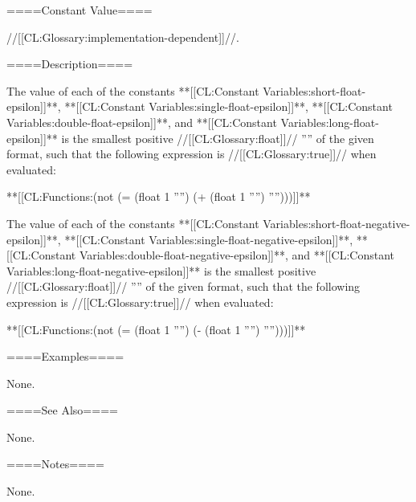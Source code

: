 
====Constant Value====

//[[CL:Glossary:implementation-dependent]]//.

====Description====

The value of each of the constants **[[CL:Constant Variables:short-float-epsilon]]**, **[[CL:Constant Variables:single-float-epsilon]]**, **[[CL:Constant Variables:double-float-epsilon]]**, and **[[CL:Constant Variables:long-float-epsilon]]** is the smallest positive //[[CL:Glossary:float]]// ''\epsilon'' of the given format, such that the following expression is //[[CL:Glossary:true]]// when evaluated:

**[[CL:Functions:(not (= (float 1 ''\epsilon'') (+ (float 1 ''\epsilon'') ''\epsilon'')))\/]]**

The value of each of the constants **[[CL:Constant Variables:short-float-negative-epsilon]]**, **[[CL:Constant Variables:single-float-negative-epsilon]]**, **[[CL:Constant Variables:double-float-negative-epsilon]]**, and **[[CL:Constant Variables:long-float-negative-epsilon]]** is the smallest positive //[[CL:Glossary:float]]// ''\epsilon'' of the given format, such that the following expression is //[[CL:Glossary:true]]// when evaluated:

**[[CL:Functions:(not (= (float 1 ''\epsilon'') (- (float 1 ''\epsilon'') ''\epsilon'')))\/]]**

====Examples====

None.

====See Also====

None.

====Notes====

None.

